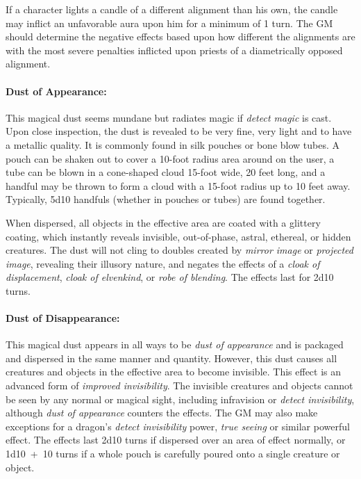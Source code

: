 \begin{multicols}{2}
If a character lights a candle of a different alignment than his own, the candle may inflict an unfavorable aura upon him for a minimum of 1 turn.  The GM should determine the negative effects based upon how different the alignments are with the most severe penalties inflicted upon priests of a diametrically opposed alignment.

\paragraph{Dust of Appearance:} This magical dust seems mundane but radiates magic if \textit{detect magic} is cast.  Upon close inspection, the dust is revealed to be very fine, very light and to have a metallic quality.  It is commonly found in silk pouches or bone blow tubes.  A pouch can be shaken out to cover a 10-foot radius area around on the user, a tube can be blown in a cone-shaped cloud 15-foot wide, 20 feet long, and a handful may be thrown to form a cloud with a 15-foot radius up to 10 feet away.  Typically, 5d10 handfuls (whether in pouches or tubes) are found together.

When dispersed, all objects in the effective area are coated with a glittery coating, which instantly reveals invisible, out-of-phase, astral, ethereal, or hidden creatures.  The dust will not cling to doubles created by \textit{mirror image} or \textit{projected image}, revealing their illusory nature, and negates the effects of a \textit{cloak of displacement}, \textit{cloak of elvenkind}, or \textit{robe of blending}.  The effects last for 2d10 turns.

\paragraph{Dust of Disappearance:} This magical dust appears in all ways to be \textit{dust of appearance} and is packaged and dispersed in the same manner and quantity.  However, this dust causes all creatures and objects in the effective area to become invisible.  This effect is an advanced form of \textit{improved invisibility}.  The invisible creatures and objects cannot be seen by any normal or magical sight, including infravision or \textit{detect invisibility}, although \textit{dust of appearance} counters the effects.  The GM may also make exceptions for a dragon's \textit{detect invisibility} power, \textit{true seeing} or similar powerful effect.  The effects last 2d10 turns if dispersed over an area of effect normally, or 1d10~+~10 turns if a whole pouch is carefully poured onto a single creature or object.


\end{multicols}
